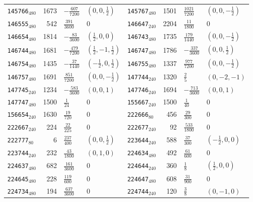 {\begin{longtable}{@{}lrll@{\hspace{2em}}lrll@{}}
\texttt{145766}$_{480}$ & 1673 & $-\tfrac{607}{7200}$ & $(0,0,\tfrac{1}{2})$ & \texttt{145767}$_{480}$ & 1501 & $\tfrac{1021}{7200}$ & $(0,0,-\tfrac{1}{2})$\\
\texttt{146555}$_{480}$ & 542 & $\tfrac{391}{3600}$ & 0 & \texttt{146647}$_{240}$ & 2204 & $\tfrac{11}{1800}$ & 0\\
\texttt{146654}$_{480}$ & 1814 & $-\tfrac{83}{3600}$ & $(\tfrac{1}{2},0,0)$ & \texttt{146743}$_{480}$ & 1735 & $\tfrac{179}{1440}$ & $(0,0,-\tfrac{1}{2})$\\
\texttt{146744}$_{480}$ & 1681 & $-\tfrac{479}{7200}$ & $(\tfrac{1}{2},-1,\tfrac{1}{2})$ & \texttt{146747}$_{480}$ & 1786 & $-\tfrac{337}{3600}$ & $(0,0,\tfrac{1}{2})$\\
\texttt{146754}$_{480}$ & 1435 & $-\tfrac{37}{1440}$ & $(-\tfrac{1}{2},0,\tfrac{1}{2})$ & \texttt{146755}$_{480}$ & 1337 & $\tfrac{977}{7200}$ & $(0,0,-\tfrac{1}{2})$\\
\texttt{146757}$_{480}$ & 1691 & $\tfrac{851}{7200}$ & $(0,0,-\tfrac{1}{2})$ & \texttt{147744}$_{240}$ & 1320 & $\tfrac{2}{5}$ & $(0,-2,-1)$\\
\texttt{147745}$_{240}$ & 1234 & $-\tfrac{583}{3600}$ & $(0,0,1)$ & \texttt{147746}$_{240}$ & 1694 & $-\tfrac{713}{3600}$ & $(0,0,1)$\\
\texttt{147747}$_{480}$ & 1500 & $\tfrac{1}{24}$ & 0 & \texttt{155667}$_{240}$ & 1500 & $\tfrac{1}{40}$ & 0\\
\texttt{156654}$_{240}$ & 1630 & $\tfrac{19}{720}$ & 0 & \texttt{222666}$_{80}$ & 456 & $\tfrac{29}{300}$ & 0\\
\texttt{222667}$_{240}$ & 224 & $\tfrac{22}{225}$ & 0 & \texttt{222677}$_{240}$ & 92 & $\tfrac{533}{1800}$ & 0\\
\texttt{222777}$_{80}$ & 6 & $\tfrac{237}{400}$ & $(0,0,\tfrac{1}{2})$ & \texttt{223644}$_{240}$ & 588 & $\tfrac{37}{300}$ & $(-\tfrac{1}{2},0,0)$\\
\texttt{223744}$_{240}$ & 232 & $\tfrac{43}{1800}$ & $(0,1,0)$ & \texttt{224634}$_{480}$ & 492 & $\tfrac{61}{600}$ & 0\\
\texttt{224637}$_{480}$ & 682 & $\tfrac{161}{3600}$ & 0 & \texttt{224644}$_{240}$ & 360 & $\tfrac{1}{8}$ & $(\tfrac{1}{2},0,0)$\\
\texttt{224645}$_{480}$ & 228 & $\tfrac{119}{600}$ & 0 & \texttt{224647}$_{480}$ & 608 & $\tfrac{31}{900}$ & 0\\
\texttt{224734}$_{480}$ & 194 & $\tfrac{637}{3600}$ & 0 & \texttt{224744}$_{240}$ & 120 & $\tfrac{3}{8}$ & $(0,-1,0)$\\

\end{longtable}}
